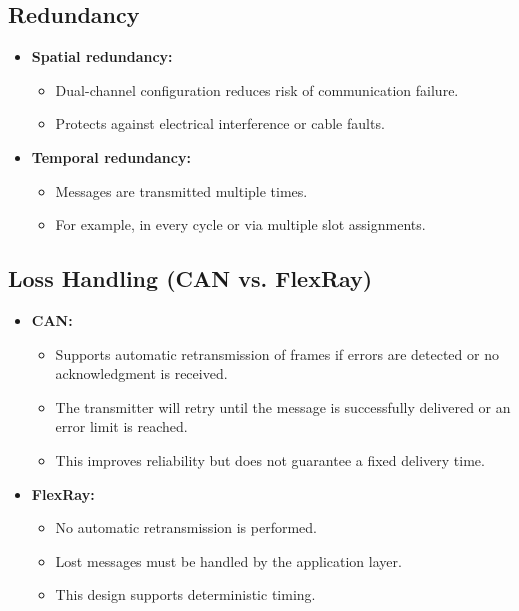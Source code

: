 \subsection*{Redundancy}

\begin{itemize}
    \item \textbf{Spatial redundancy:}
    \begin{itemize}
        \item Dual-channel configuration reduces risk of communication failure.
        \item Protects against electrical interference or cable faults.
    \end{itemize}
    
    \item \textbf{Temporal redundancy:}
    \begin{itemize}
        \item Messages are transmitted multiple times.
        \item For example, in every cycle or via multiple slot assignments.
    \end{itemize}
\end{itemize}

\subsection*{Loss Handling (CAN vs. FlexRay)}

\begin{itemize}
    \item \textbf{CAN:}
    \begin{itemize}
        \item Supports automatic retransmission of frames if errors are detected or no acknowledgment is received.
        \item The transmitter will retry until the message is successfully delivered or an error limit is reached.
        \item This improves reliability but does not guarantee a fixed delivery time.
    \end{itemize}
    
    \item \textbf{FlexRay:}
    \begin{itemize}
        \item No automatic retransmission is performed.
        \item Lost messages must be handled by the application layer.
        \item This design supports deterministic timing.
    \end{itemize}
\end{itemize}
